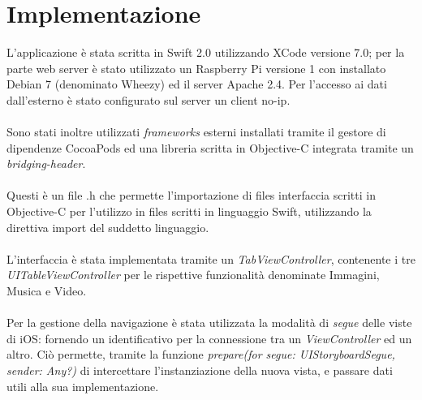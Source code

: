 \section{Implementazione}
L'applicazione è stata scritta in Swift 2.0 utilizzando XCode versione 7.0; per la parte web server è stato utilizzato un Raspberry Pi versione 1 con installato Debian 7 (denominato Wheezy) ed il server Apache 2.4. Per l'accesso ai dati dall'esterno è stato configurato sul server un client no-ip.\\\\
Sono stati inoltre utilizzati \textit{frameworks} esterni installati tramite il gestore di dipendenze CocoaPods ed una libreria scritta in Objective-C integrata tramite un \textit{bridging-header}.\\\\
Questi è un file .h che permette l'importazione di files interfaccia scritti in Objective-C per l'utilizzo in files scritti in linguaggio Swift, utilizzando la direttiva import del suddetto linguaggio.\\\\
L'interfaccia è stata implementata tramite un \textit{TabViewController}, contenente i tre \textit{UITableViewController} per le rispettive funzionalità denominate Immagini, Musica e Video.\\\\
Per la gestione della navigazione è stata utilizzata la modalità di \textit{segue} delle viste di iOS: fornendo un identificativo per la connessione tra un \textit{ViewController} ed un altro. Ciò permette, tramite la funzione \textit{prepare(for segue: UIStoryboardSegue, sender: Any?)} di intercettare l'instanziazione della nuova vista, e passare dati utili alla sua implementazione.\ 
